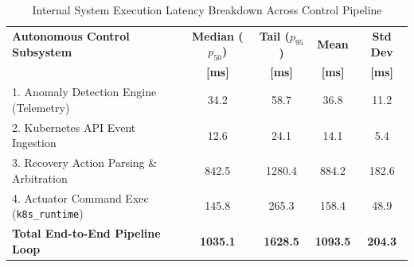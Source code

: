 \begin{table}[t]
\caption{Internal System Execution Latency Breakdown Across Control Pipeline}
\label{tab:latency_profiling}
\centering
\small
\renewcommand{\arraystretch}{1.2}
\begin{tabular}{lcccc}
\hline
\textbf{Autonomous Control Subsystem} & \textbf{Median ($p_{50}$)} & \textbf{Tail ($p_{95}$)} & \textbf{Mean} & \textbf{Std Dev} \\
 & \textbf{[ms]} & \textbf{[ms]} & \textbf{[ms]} & \textbf{[ms]} \\
\hline
1. Anomaly Detection Engine (Telemetry) & 34.2 & 58.7 & 36.8 & 11.2 \\
2. Kubernetes API Event Ingestion & 12.6 & 24.1 & 14.1 & 5.4 \\
3. Recovery Action Parsing \& Arbitration & 842.5 & 1280.4 & 884.2 & 182.6 \\
4. Actuator Command Exec (\texttt{k8s\_runtime}) & 145.8 & 265.3 & 158.4 & 48.9 \\
\hline
\textbf{Total End-to-End Pipeline Loop} & \textbf{1035.1} & \textbf{1628.5} & \textbf{1093.5} & \textbf{204.3} \\
\hline
\end{tabular}
\end{table}
